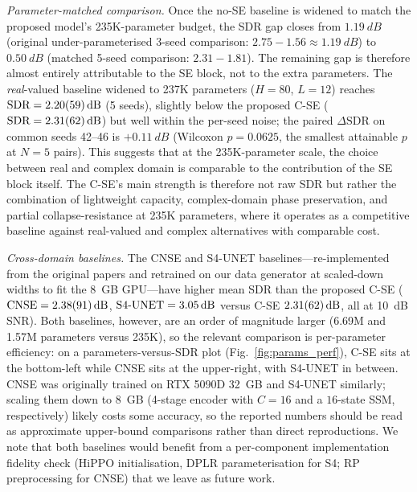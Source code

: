 \documentclass[twocolumn,english]{svjour3}
\begin{document}
\begin{sloppypar}
\emph{Parameter-matched comparison.} Once the no-SE baseline is widened to match the proposed model's 235K-parameter budget, the SDR gap closes from $\SI{1.19}{dB}$ (original under-parameterised 3-seed comparison: $\num{2.75} - \num{1.56} \approx \SI{1.19}{dB}$) to $\SI{0.50}{dB}$ (matched 5-seed comparison: $\num{2.31} - \num{1.81}$). The remaining gap is therefore almost entirely attributable to the SE block, not to the extra parameters. The \emph{real}-valued baseline widened to 237K parameters ($H{=}80$, $L{=}12$) reaches $\text{SDR}=\SI{2.20 \pm 0.59}{dB}$ (5 seeds), slightly below the proposed C-SE ($\text{SDR}=\SI{2.31 \pm 0.62}{dB}$) but well within the per-seed noise; the paired $\Delta\text{SDR}$ on common seeds 42--46 is $+\SI{0.11}{dB}$ (Wilcoxon $p=0.0625$, the smallest attainable $p$ at $N{=}5$ pairs). This suggests that at the 235K-parameter scale, the choice between real and complex domain is comparable to the contribution of the SE block itself. The C-SE's main strength is therefore not raw SDR but rather the combination of lightweight capacity, complex-domain phase preservation, and partial collapse-resistance at 235K parameters, where it operates as a competitive baseline against real-valued and complex alternatives with comparable cost.
\end{sloppypar}

\emph{Cross-domain baselines.} The CNSE and S4-UNET baselines---re-implemented from the original papers and retrained on our data generator at scaled-down widths to fit the \SI{8}{GB} GPU---have higher mean SDR than the proposed C-SE ($\text{CNSE}=\SI{2.38 \pm 0.91}{dB}$, $\text{S4-UNET}=\SI{3.05 \pm 0.00}{dB}$ versus C-SE $\SI{2.31 \pm 0.62}{dB}$, all at \SI{10}{dB} SNR). Both baselines, however, are an order of magnitude larger (6.69M and 1.57M parameters versus 235K), so the relevant comparison is per-parameter efficiency: on a parameters-versus-SDR plot (Fig.~\ref{fig:params_perf}), C-SE sits at the bottom-left while CNSE sits at the upper-right, with S4-UNET in between. CNSE was originally trained on RTX 5090D \SI{32}{GB} and S4-UNET similarly; scaling them down to \SI{8}{GB} (4-stage encoder with $C{=}16$ and a $16$-state SSM, respectively) likely costs some accuracy, so the reported numbers should be read as approximate upper-bound comparisons rather than direct reproductions. We note that both baselines would benefit from a per-component implementation fidelity check (HiPPO initialisation, DPLR parameterisation for S4; RP preprocessing for CNSE) that we leave as future work.
\end{document}
